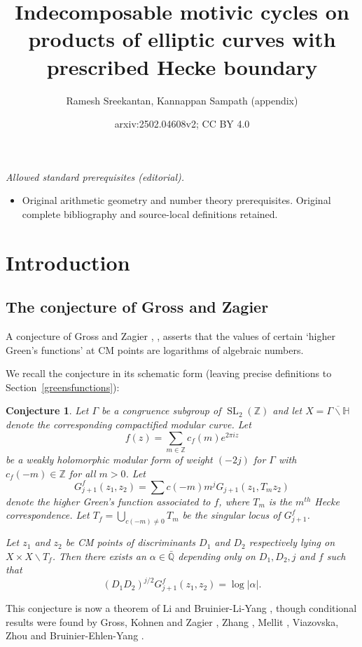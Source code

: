 \documentclass[11pt,a4paper]{article}
\title{Indecomposable motivic cycles on products of elliptic curves with prescribed Hecke boundary}
\author{Ramesh Sreekantan, Kannappan Sampath (appendix)}
\date{arxiv:2502.04608v2; CC BY 4.0}
\newtheorem {conj}[defn]{Conjecture}
\newcommand {\ZZ}{{\mathds Z}}
\newcommand {\Q}{{\mathds Q}}
\newcommand {\HH}{{\mathds H}}
\DeclareMathOperator{\SL}{SL}
\begin{document}
\maketitle
\noindent\textit{Allowed standard prerequisites (editorial).}\begin{itemize}
\item Original arithmetic geometry and number theory prerequisites. Original complete bibliography and source-local definitions retained.
\end{itemize}\medskip
\section{Introduction}

\subsection{The conjecture of Gross and Zagier}

A conjecture of Gross and Zagier \cite{grza}, \cite{GKZ}, \cite{zagiICM} asserts that the values of certain `higher Green's functions' at CM points are logarithms of algebraic numbers. 

We recall the conjecture in its schematic form (leaving precise definitions to Section~\ref{greensfunctions}):

\begin{conj} Let $\Gamma$ be a congruence subgroup of $\SL_2(\mathbb{Z})$ and let $X=\overline {\Gamma\backslash \HH}$ denote the corresponding compactified modular curve. Let 
	$$f(z)=\sum_{m \in \ZZ} c_f(m)e^{2\pi iz}$$
	be a weakly holomorphic modular form of weight $(-2j)$ for $\Gamma$ with $c_f(-m) \in \ZZ$ for all $m>0$. Let 
	$$G_{j+1}^f(z_1,z_2)=\sum c(-m)m^jG_{j+1}(z_1,T_m z_2)$$
	denote the higher Green's function associated to $f$, where $T_m$ is the $m^{th}$ Hecke correspondence. Let $T_f=\bigcup_{c(-m)\neq 0} T_m$ be the singular locus of $G^f_{j+1}$.
	
	
	Let $z_1$ and $z_2$ be CM points of discriminants $D_1$ and $D_2$  respectively lying on $X\times X \backslash T_f$. Then there exists an $\alpha  \in \bar{\Q}$  depending only on $D_1, D_2, j$ and $f$  such that 
	$$(D_1 D_2)^{j/2} G^f_{j+1}(z_1,z_2)=\log|\alpha|.$$
	
\end{conj}

This conjecture is now a theorem of Li \cite{li} and Bruinier-Li-Yang \cite{BLY}, though conditional results were found by Gross, Kohnen and Zagier \cite{GKZ}, Zhang \cite{zhan}, Mellit \cite{mell}, Viazovska\cite{viaz}, Zhou \cite{zhou} and Bruinier-Ehlen-Yang \cite{BEY}.
\end{document}
